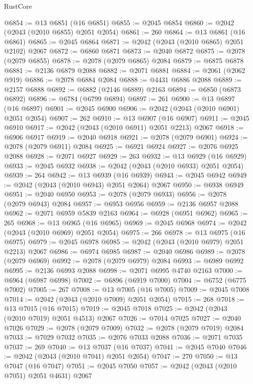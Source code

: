 \begin{lexlean}{RustCore}
\begin{coremodule}
@6854 := @13 @6851 (@16 @6851)
@6855 := @2045 @6854
@6860 := @2042 (@2043 (@2010 @6855) @2051 @2054)
@6861 := 260
@6864 := @13 @6861 (@16 @6861)
@6865 := @2045 @6864
@6871 := @2042 (@2043 (@2010 @6865) @2051 @2102) @2067
@6872 := @6860 @6871
@6873 := @2040 @6872
@6875 := @2078 (@2079 @6855)
@6878 := @2078 (@2079 @6865) @2084
@6879 := @6875 @6878
@6881 := @2136 @6879 @2088
@6882 := @2071 @6881
@6884 := @2061 (@2062 @919)
@6886 := @2078 @6884 @2084
@6888 := @4431 @6886 @2088
@6889 := @2157 @6888
@6892 := @6882 (@2146 @6889) @2163
@6894 := @6850 (@6873 @6892)
@6896 := @6784 (@6799 @6894)
@6897 := 261
@6900 := @13 @6897 (@16 @6897)
@6901 := @2045 @6900
@6906 := @2042 (@2043 (@2010 @6901) @2051 @2054)
@6907 := 262
@6910 := @13 @6907 (@16 @6907)
@6911 := @2045 @6910
@6917 := @2042 (@2043 (@2010 @6911) @2051 @2213) @2067
@6918 := @6906 @6917
@6919 := @2040 @6918
@6921 := @2078 (@2079 @6901)
@6924 := @2078 (@2079 @6911) @2084
@6925 := @6921 @6924
@6927 := @2076 @6925 @2088
@6928 := @2071 @6927
@6929 := 263
@6932 := @13 @6929 (@16 @6929)
@6933 := @2045 @6932
@6938 := @2042 (@2043 (@2010 @6933) @2051 @2054)
@6939 := 264
@6942 := @13 @6939 (@16 @6939)
@6943 := @2045 @6942
@6949 := @2042 (@2043 (@2010 @6943) @2051 @2064) @2067
@6950 := @6938 @6949
@6951 := @2040 @6950
@6953 := @2078 (@2079 @6933)
@6956 := @2078 (@2079 @6943) @2084
@6957 := @6953 @6956
@6959 := @2136 @6957 @2088
@6962 := @2071 @6959 @5839 @2163
@6964 := @6928 (@6951 @6962)
@6965 := 265
@6968 := @13 @6965 (@16 @6965)
@6969 := @2045 @6968
@6974 := @2042 (@2043 (@2010 @6969) @2051 @2054)
@6975 := 266
@6978 := @13 @6975 (@16 @6975)
@6979 := @2045 @6978
@6985 := @2042 (@2043 (@2010 @6979) @2051 @2213) @2067
@6986 := @6974 @6985
@6987 := @2040 @6986
@6989 := @2078 (@2079 @6969)
@6992 := @2078 (@2079 @6979) @2084
@6993 := @6989 @6992
@6995 := @2136 @6993 @2088
@6998 := @2071 @6995 @4740 @2163
@7000 := @6964 (@6987 @6998)
@7002 := @6896 (@6919 @7000)
@7004 := @6752 (@6775 @7002)
@7005 := 267
@7008 := @13 @7005 (@16 @7005)
@7009 := @2045 @7008
@7014 := @2042 (@2043 (@2010 @7009) @2051 @2054)
@7015 := 268
@7018 := @13 @7015 (@16 @7015)
@7019 := @2045 @7018
@7025 := @2042 (@2043 (@2010 @7019) @2051 @4513) @2067
@7026 := @7014 @7025
@7027 := @2040 @7026
@7029 := @2078 (@2079 @7009)
@7032 := @2078 (@2079 @7019) @2084
@7033 := @7029 @7032
@7035 := @2076 @7033 @2088
@7036 := @2071 @7035
@7037 := 269
@7040 := @13 @7037 (@16 @7037)
@7041 := @2045 @7040
@7046 := @2042 (@2043 (@2010 @7041) @2051 @2054)
@7047 := 270
@7050 := @13 @7047 (@16 @7047)
@7051 := @2045 @7050
@7057 := @2042 (@2043 (@2010 @7051) @2051 @4631) @2067

\end{coremodule}
\end{lexlean}
